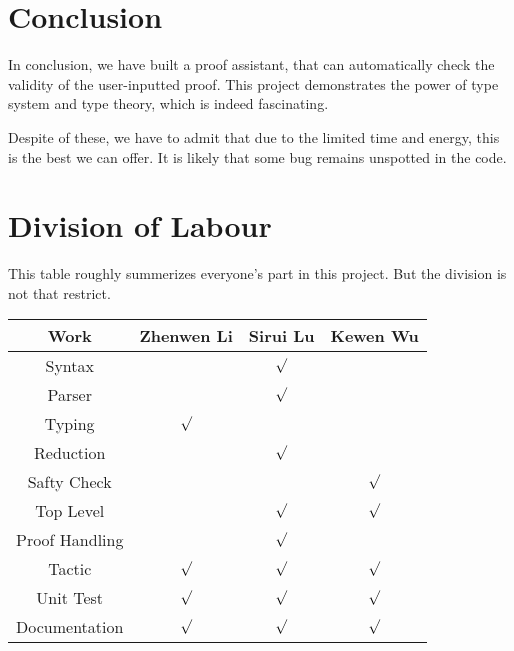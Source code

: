 \section{Conclusion}

In conclusion, we have built a proof assistant, that can automatically check the validity
of the user-inputted proof. This project demonstrates the power of type system and type theory,
which is indeed fascinating.\par
Despite of these, we have to admit that due to the limited time and energy, 
this is the best we can offer. It is likely that some bug remains unspotted in the code.

\section{Division of Labour}

This table roughly summerizes everyone's part in this project. 
But the division is not that restrict.
\begin{center}
\begin{tabular}{|c|c|c|c|}
\hline
Work & Zhenwen Li & Sirui Lu & Kewen Wu\\
\hline
Syntax & & $\surd$ &\\
Parser & & $\surd$ &\\
Typing & $\surd$ & &\\
Reduction & & $\surd$ &\\
Safty Check & & & $\surd$\\
Top Level & & $\surd$ & $\surd$\\
Proof Handling & & $\surd$ & \\
Tactic & $\surd$ & $\surd$ & $\surd$\\
Unit Test & $\surd$ & $\surd$ & $\surd$\\
Documentation & $\surd$ & $\surd$ & $\surd$\\
\hline
\end{tabular}
\end{center}


